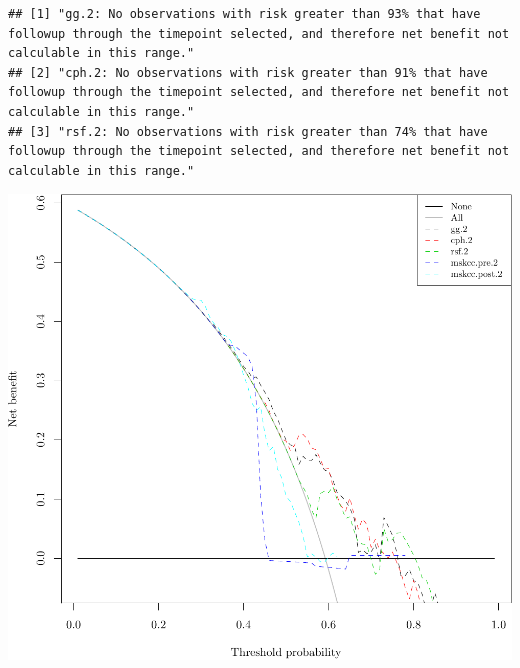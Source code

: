 \documentclass{article}\usepackage[]{graphicx}\usepackage[]{color}
\makeatletter
\def\maxwidth{ %
  \ifdim\Gin@nat@width>\linewidth
    \linewidth
  \else
    \Gin@nat@width
  \fi
}
\newenvironment{kframe}{%
 \def\at@end@of@kframe{}%
 \ifinner\ifhmode%
  \def\at@end@of@kframe{\end{minipage}}%
  \begin{minipage}{\columnwidth}%
 \fi\fi%
 \def\FrameCommand##1{\hskip\@totalleftmargin \hskip-\fboxsep
 \colorbox{shadecolor}{##1}\hskip-\fboxsep
     \hskip-\linewidth \hskip-\@totalleftmargin \hskip\columnwidth}%
 \MakeFramed {\advance\hsize-\width
   \@totalleftmargin\z@ \linewidth\hsize
   \@setminipage}}%
 {\par\unskip\endMakeFramed%
 \at@end@of@kframe}
\newenvironment{knitrout}{}{} %
\makeatother
\begin{document}
\begin{knitrout}
\begin{kframe}
\begin{alltt}
\end{alltt}
\begin{verbatim}
## [1] "gg.2: No observations with risk greater than 93% that have followup through the timepoint selected, and therefore net benefit not calculable in this range." 
## [2] "cph.2: No observations with risk greater than 91% that have followup through the timepoint selected, and therefore net benefit not calculable in this range."
## [3] "rsf.2: No observations with risk greater than 74% that have followup through the timepoint selected, and therefore net benefit not calculable in this range."
\end{verbatim}
\end{kframe}

{\centering \includegraphics[width=\maxwidth]{figure/05-model-selection-dca-2} 

}



\end{knitrout}
\end{document}
